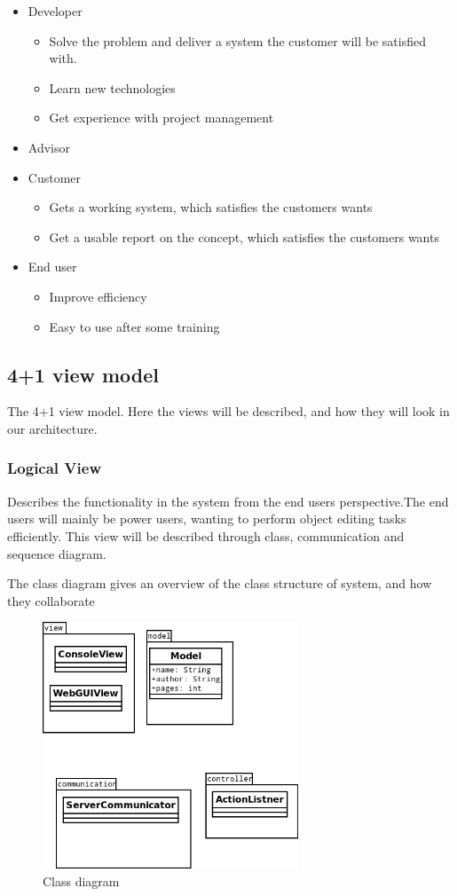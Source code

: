 \begin{itemize}
    \item Developer
    \begin{itemize}
        \item Solve the problem and deliver a system the customer will be satisfied with.
        \item Learn new technologies
        \item Get experience with project management
        \end{itemize}
    \item Advisor
    \item Customer
    \begin{itemize}
        \item Gets a working system, which satisfies the customers wants
        \item Get a usable report on the concept, which satisfies the customers wants
    \end{itemize}
    \item End user
    \begin{itemize}
        \item Improve efficiency
        \item Easy to use after some training
    \end{itemize}
\end{itemize}



\subsection{4+1 view model}
The 4+1 view model. Here the views will be described, and how they will look in our architecture. 

\subsubsection{Logical View}
Describes the functionality in the system from the end users perspective.The end users will mainly be power users, wanting to perform object editing tasks efficiently. This view will be described through class, communication and sequence diagram.

The class diagram gives an overview of the class structure of system, and how they collaborate

\begin{figure}
\centering
\includegraphics[width=3in]{image/classdiagram.png}
\caption{Class diagram}
\end{figure}

